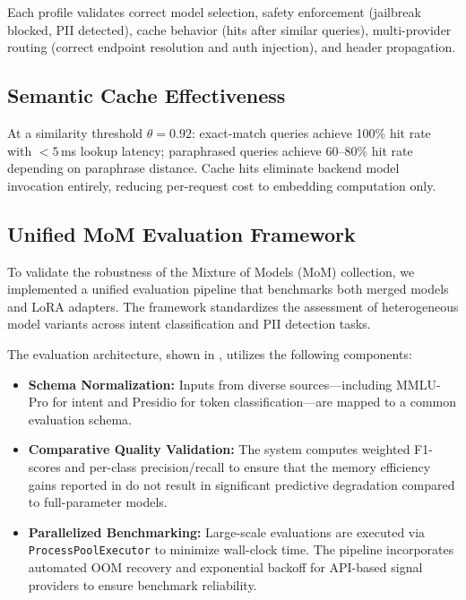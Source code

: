 Each profile validates correct model selection, safety enforcement (jailbreak blocked, PII detected), cache behavior (hits after similar queries), multi-provider routing (correct endpoint resolution and auth injection), and header propagation.

\subsection{Semantic Cache Effectiveness}

At a similarity threshold $\theta = 0.92$:
exact-match queries achieve 100\% hit rate with $< 5$\,ms lookup latency;
paraphrased queries achieve 60--80\% hit rate depending on paraphrase distance.
Cache hits eliminate backend model invocation entirely, reducing per-request cost to embedding computation only.

\subsection{Unified MoM Evaluation Framework}

To validate the robustness of the Mixture of Models (MoM) collection, we implemented a unified evaluation pipeline that benchmarks both merged models and LoRA adapters. The framework standardizes the assessment of heterogeneous model variants across intent classification and PII detection tasks.

The evaluation architecture, shown in , utilizes the following components:

\begin{itemize}
    \item \textbf{Schema Normalization:} Inputs from diverse sources—including MMLU-Pro for intent and Presidio for token classification—are mapped to a common evaluation schema.
    \item \textbf{Comparative Quality Validation:} The system computes weighted F1-scores and per-class precision/recall to ensure that the memory efficiency gains reported in  do not result in significant predictive degradation compared to full-parameter models.
    \item \textbf{Parallelized Benchmarking:} Large-scale evaluations are executed via \texttt{ProcessPoolExecutor} to minimize wall-clock time. The pipeline incorporates automated OOM recovery and exponential backoff for API-based signal providers to ensure benchmark reliability.
\end{itemize}

